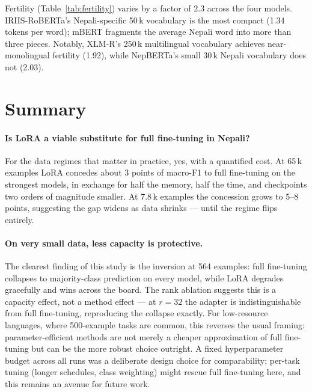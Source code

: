 Fertility (Table~\ref{tab:fertility}) varies by a factor of 2.3 across the
four models. IRIIS-RoBERTa's Nepali-specific 50\,k vocabulary is the most
compact (1.34 tokens per word); mBERT fragments the average Nepali word into
more than three pieces. Notably, XLM-R's 250\,k multilingual vocabulary
achieves near-monolingual fertility (1.92), while NepBERTa's small 30\,k
Nepali vocabulary does not (2.03).

\section{Summary}
\label{sec:summary}

\paragraph{Is LoRA a viable substitute for full fine-tuning in Nepali?}
For the data regimes that matter in practice, yes, with a quantified cost.
At 65\,k examples LoRA concedes about 3 points of macro-F1 to full
fine-tuning on the strongest models, in exchange for half the memory, half
the time, and checkpoints two orders of magnitude smaller. At 7.8\,k
examples the concession grows to 5--8 points, suggesting the gap widens as
data shrinks --- until the regime flips entirely.

\paragraph{On very small data, less capacity is protective.}
The clearest finding of this study is the inversion at 564 examples: full
fine-tuning collapses to majority-class prediction on every model, while
LoRA degrades gracefully and wins across the board. The rank ablation
suggests this is a capacity effect, not a method effect --- at $r{=}32$ the
adapter is indistinguishable from full fine-tuning, reproducing the collapse
exactly. For low-resource languages, where 500-example tasks are
common, this reverses the usual framing: parameter-efficient methods are not
merely a cheaper approximation of full fine-tuning but can be the more
robust choice outright. A fixed hyperparameter budget across all runs was a
deliberate design choice for comparability; per-task tuning (longer
schedules, class weighting) might rescue full fine-tuning here, and this
remains an avenue for future work.

